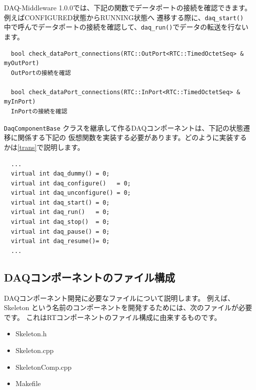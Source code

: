 \documentclass[a4j,10pt,dvips,onecolumn,oneside,final]{jarticle}%
\begin{document}
DAQ-Middleware 1.0.0では、下記の関数でデータポートの接続を確認できます。例えばCONFIGURED状態からRUNNING状態へ
遷移する際に、\verb|daq_start()| 中で呼んでデータポートの接続を確認して、\verb|daq_run()|でデータの転送を行ないます。
\begin{Verbatim}  
  bool check_dataPort_connections(RTC::OutPort<RTC::TimedOctetSeq> & myOutPort)
  OutPortの接続を確認

  bool check_dataPort_connections(RTC::InPort<RTC::TimedOctetSeq> & myInPort)
  InPortの接続を確認
\end{Verbatim}

\verb|DaqComponentBase| クラスを継承して作るDAQコンポーネントは、下記の状態遷移に関係する下記の
仮想関数を実装する必要があります。どのように実装するかは\ref{trans}で説明します。

\begin{Verbatim}
  ...
  virtual int daq_dummy() = 0;
  virtual int daq_configure()   = 0;
  virtual int daq_unconfigure() = 0;
  virtual int daq_start() = 0;
  virtual int daq_run()   = 0;
  virtual int daq_stop()  = 0;
  virtual int daq_pause() = 0;
  virtual int daq_resume()= 0;
  ...
\end{Verbatim}



\subsection{DAQコンポーネントのファイル構成}
DAQコンポーネント開発に必要なファイルについて説明します。
例えば、Skeleton という名前のコンポーネントを開発するためには、次のファイルが必要です。
これはRTコンポーネントのファイル構成に由来するものです。
\begin{itemize}
\item Skeleton.h
\item Skeleton.cpp
\item SkeletonComp.cpp
\item Makefile
\end{itemize}
\end{document}
